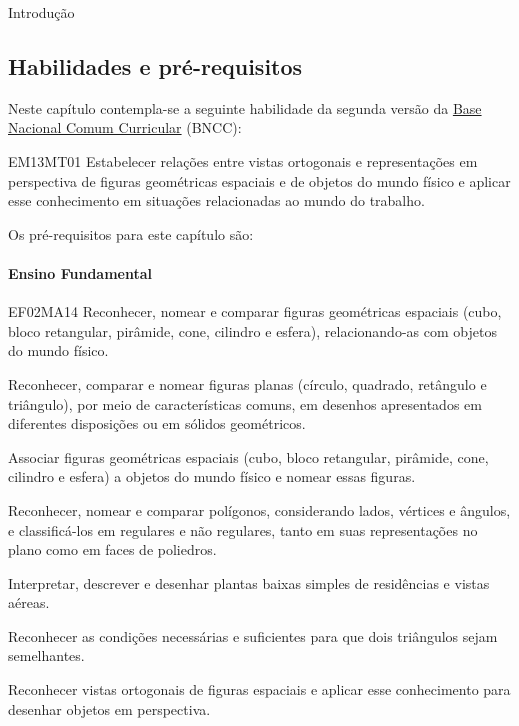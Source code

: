 \mainmatter

\begin{apresentacao}{Introdução}

\subsection{Habilidades e pré-requisitos}
Neste capítulo contempla-se a seguinte habilidade da segunda versão da \href{http://historiadabncc.mec.gov.br/documentos/bncc-2versao.revista.pdf}{Base Nacional Comum Curricular} (BNCC):

\begin{habilities}{EM13MT01}
Estabelecer relações entre vistas ortogonais e representações em perspectiva de figuras geométricas espaciais e de objetos do mundo físico e aplicar esse conhecimento em situações relacionadas ao mundo do trabalho.
\end{habilities}

Os pré-requisitos para este capítulo são:

\paragraph{Ensino Fundamental}
\begin{habilities}{EF02MA14}
Reconhecer, nomear e comparar figuras geométricas espaciais (cubo, bloco retangular, pirâmide, cone, cilindro e esfera), relacionando-as com objetos do mundo físico.

Reconhecer, comparar e nomear figuras planas (círculo, quadrado, retângulo e triângulo), por meio de características comuns, em desenhos apresentados em diferentes disposições ou em sólidos geométricos.

Associar figuras geométricas espaciais (cubo, bloco retangular, pirâmide, cone, cilindro e esfera) a objetos do mundo físico e nomear essas figuras.

Reconhecer, nomear e comparar polígonos, considerando lados, vértices e ângulos, e classificá-los em regulares e não regulares, tanto em suas representações no plano como em faces de poliedros.

Interpretar, descrever e desenhar plantas baixas simples de residências e vistas aéreas.

Reconhecer as condições necessárias e suficientes para que dois triângulos sejam semelhantes.

Reconhecer vistas ortogonais de figuras espaciais e aplicar esse conhecimento para desenhar objetos em perspectiva.
\end{habilities}



\end{apresentacao}
